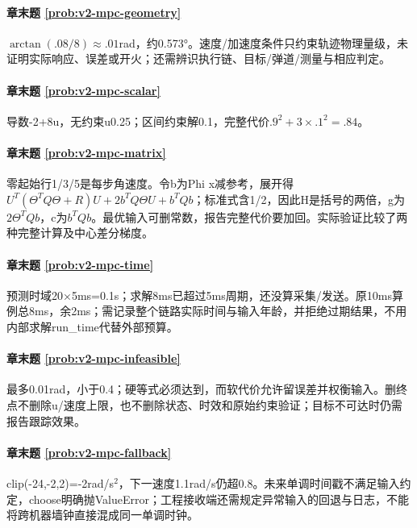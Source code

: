 \paragraph*{章末题 \ref{prob:v2-mpc-geometry}}
\begin{solution}
$\arctan(.08/8)\approx.01$rad，约0.573°。速度/加速度条件只约束轨迹物理量级，未证明实际响应、误差或开火；还需辨识执行链、目标/弹道/测量与相应判定。
\end{solution}
\paragraph*{章末题 \ref{prob:v2-mpc-scalar}}
\begin{solution}
导数-2+8u，无约束u0.25；区间约束解0.1，完整代价$.9^2+3\times.1^2=.84$。
\end{solution}
\paragraph*{章末题 \ref{prob:v2-mpc-matrix}}
\begin{solution}
零起始行1/3/5是每步角速度。令b为Phi x减参考，展开得$U^T(\Theta^TQ\Theta+R)U+2b^TQ\Theta U+b^TQb$；标准式含1/2，因此H是括号的两倍，g为$2\Theta^TQb$，c为$b^TQb$。最优输入可删常数，报告完整代价要加回。实际验证比较了两种完整计算及中心差分梯度。
\end{solution}
\paragraph*{章末题 \ref{prob:v2-mpc-time}}
\begin{solution}
预测时域20×5ms=0.1s；求解8ms已超过5ms周期，还没算采集/发送。原10ms算例总8ms，余2ms；需记录整个链路实际时间与输入年龄，并拒绝过期结果，不用内部求解run\_time代替外部预算。
\end{solution}
\paragraph*{章末题 \ref{prob:v2-mpc-infeasible}}
\begin{solution}
最多0.01rad，小于0.4；硬等式必须达到，而软代价允许留误差并权衡输入。删终点不删除u/速度上限，也不删除状态、时效和原始约束验证；目标不可达时仍需报告跟踪效果。
\end{solution}
\paragraph*{章末题 \ref{prob:v2-mpc-fallback}}
\begin{solution}
clip(-24,-2,2)=-2rad/s$^2$，下一速度1.1rad/s仍超0.8。未来单调时间戳不满足输入约定，choose明确抛ValueError；工程接收端还需规定异常输入的回退与日志，不能将跨机器墙钟直接混成同一单调时钟。
\end{solution}
